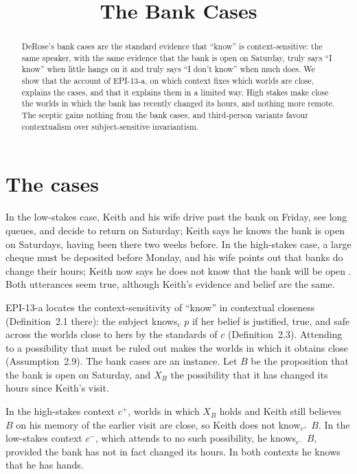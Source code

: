 \documentclass{situationist-preprint}
\title{The Bank Cases}
\begin{document}
\maketitle

\begin{abstract}
DeRose's bank cases are the standard evidence that \enquote{know} is context-sensitive: the same speaker, with the same evidence that the bank is open on Saturday, truly says \enquote{I know} when little hangs on it and truly says \enquote{I don't know} when much does. We show that the account of EPI-13-a, on which context fixes which worlds are close, explains the cases, and that it explains them in a limited way. High stakes make close the worlds in which the bank has recently changed its hours, and nothing more remote. The sceptic gains nothing from the bank cases, and third-person variants favour contextualism over subject-sensitive invariantism.
\end{abstract}

\section{The cases}

In the low-stakes case, Keith and his wife drive past the bank on Friday, see long queues, and decide to return on Saturday; Keith says he knows the bank is open on Saturdays, having been there two weeks before. In the high-stakes case, a large cheque must be deposited before Monday, and his wife points out that banks do change their hours; Keith now says he does not know that the bank will be open \citep{DeRose1992}. Both utterances seem true, although Keith's evidence and belief are the same.

EPI-13-a locates the context-sensitivity of \enquote{know} in contextual closeness (Definition~2.1 there): the subject knows$_c$ $p$ if her belief is justified, true, and safe across the worlds close to hers by the standards of $c$ (Definition~2.3). Attending to a possibility that must be ruled out makes the worlds in which it obtains close (Assumption~2.9). The bank cases are an instance. Let $B$ be the proposition that the bank is open on Saturday, and $X_B$ the possibility that it has changed its hours since Keith's visit.

\begin{proposition}\label{p:limited}
In the high-stakes context $c^{+}$, worlds in which $X_B$ holds and Keith still believes $B$ on his memory of the earlier visit are close, so Keith does not know$_{c^{+}}$ $B$. In the low-stakes context $c^{-}$, which attends to no such possibility, he knows$_{c^{-}}$ $B$, provided the bank has not in fact changed its hours. In both contexts he knows that he has hands.
\end{proposition}
\end{document}
